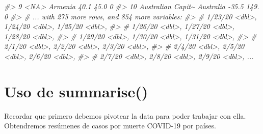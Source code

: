 \documentclass[
]{book}
\newenvironment{Shaded}{\begin{snugshade}}{\end{snugshade}}
\newcommand{\CommentTok}[1]{\textcolor[rgb]{0.56,0.35,0.01}{\textit{#1}}}
\begin{document}
\begin{Shaded}
\begin{Highlighting}[]
\CommentTok{\#\textgreater{}  9 \textless{}NA\textgreater{}              Armenia           40.1  45.0          0}
\CommentTok{\#\textgreater{} 10 Australian Capit\textasciitilde{} Australia        {-}35.5 149.           0}
\CommentTok{\#\textgreater{} \# ... with 275 more rows, and 854 more variables:}
\CommentTok{\#\textgreater{} \#   \textasciigrave{}1/23/20\textasciigrave{} \textless{}dbl\textgreater{}, \textasciigrave{}1/24/20\textasciigrave{} \textless{}dbl\textgreater{}, \textasciigrave{}1/25/20\textasciigrave{} \textless{}dbl\textgreater{},}
\CommentTok{\#\textgreater{} \#   \textasciigrave{}1/26/20\textasciigrave{} \textless{}dbl\textgreater{}, \textasciigrave{}1/27/20\textasciigrave{} \textless{}dbl\textgreater{}, \textasciigrave{}1/28/20\textasciigrave{} \textless{}dbl\textgreater{},}
\CommentTok{\#\textgreater{} \#   \textasciigrave{}1/29/20\textasciigrave{} \textless{}dbl\textgreater{}, \textasciigrave{}1/30/20\textasciigrave{} \textless{}dbl\textgreater{}, \textasciigrave{}1/31/20\textasciigrave{} \textless{}dbl\textgreater{},}
\CommentTok{\#\textgreater{} \#   \textasciigrave{}2/1/20\textasciigrave{} \textless{}dbl\textgreater{}, \textasciigrave{}2/2/20\textasciigrave{} \textless{}dbl\textgreater{}, \textasciigrave{}2/3/20\textasciigrave{} \textless{}dbl\textgreater{},}
\CommentTok{\#\textgreater{} \#   \textasciigrave{}2/4/20\textasciigrave{} \textless{}dbl\textgreater{}, \textasciigrave{}2/5/20\textasciigrave{} \textless{}dbl\textgreater{}, \textasciigrave{}2/6/20\textasciigrave{} \textless{}dbl\textgreater{},}
\CommentTok{\#\textgreater{} \#   \textasciigrave{}2/7/20\textasciigrave{} \textless{}dbl\textgreater{}, \textasciigrave{}2/8/20\textasciigrave{} \textless{}dbl\textgreater{}, \textasciigrave{}2/9/20\textasciigrave{} \textless{}dbl\textgreater{}, ...}
\end{Highlighting}
\end{Shaded}

\hypertarget{uso-de-summarise-2}{%
\section{Uso de summarise()}\label{uso-de-summarise-2}}

Recordar que primero debemos pivotear la data para poder trabajar con ella. Obtendremos resúmenes de casos por muerte COVID-19 por países.
\end{document}
